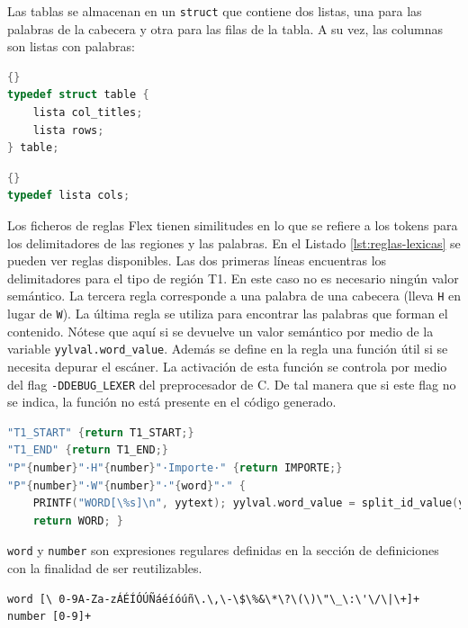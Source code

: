 Las tablas se almacenan en un \verb|struct| que contiene dos listas, una para las palabras de la cabecera y otra para las filas de la tabla. A su vez, las columnas son listas con palabras:

\noindent\begin{minipage}{.45\textwidth}
    \begin{lstlisting}[language=C,caption={},frame=tlrb,label={}]{}
typedef struct table {
    lista col_titles;
    lista rows;
} table;
    \end{lstlisting}
\end{minipage}\hfill
\begin{minipage}{.45\textwidth}
    \begin{lstlisting}[language=C,caption={},frame=tlrb,label={}]{}
typedef lista cols;
    \end{lstlisting}
\end{minipage}

Los ficheros de reglas Flex tienen similitudes en lo que se refiere a los tokens para los delimitadores de las regiones y las palabras. En el Listado \ref{lst:reglas-lexicas} se pueden ver reglas disponibles. Las dos primeras líneas encuentras los delimitadores para el tipo de región T1. En este caso no es necesario ningún valor semántico. La tercera regla corresponde a una palabra de una cabecera (lleva \verb|H| en lugar de \verb|W|). La última regla se utiliza para encontrar las palabras que forman el contenido. Nótese que aquí si se devuelve un valor semántico por medio de la variable \verb|yylval.word_value|. Además se define en la regla una función útil si se necesita depurar el escáner. La activación de esta función se controla por medio del flag \verb|-DDEBUG_LEXER| del preprocesador de C. De tal manera que si este flag no se indica, la función no está presente en el código generado.

\begin{lstlisting}[language=C,caption={Reglas léxicas habituales},label={lst:reglas-lexicas}]
"T1_START" {return T1_START;}
"T1_END" {return T1_END;}
"P"{number}"·H"{number}"·Importe·" {return IMPORTE;}
"P"{number}"·W"{number}"·"{word}"·" {
    PRINTF("WORD[\%s]\n", yytext); yylval.word_value = split_id_value(yytext);
    return WORD; }
\end{lstlisting}

\verb|word| y \verb|number| son expresiones regulares definidas en la sección de definiciones con la finalidad de ser reutilizables.

\begin{lstlisting}[caption={Expresiones regulares para palabras y números},label={lst:word-and-number}]
word [\ 0-9A-Za-zÁÉÍÓÚÑáéíóúñ\.\,\-\$\%&\*\?\(\)\"\_\:\'\/\|\+]+
number [0-9]+
\end{lstlisting}

